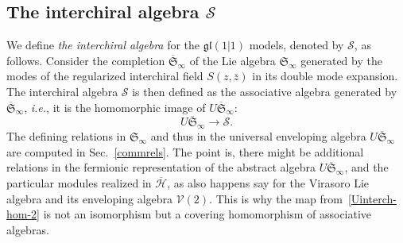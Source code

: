 \documentclass[11pt]{article}
\newcommand{\Hilb}{\mathcal{H}}
\newcommand{\cHilb}{\overline{\Hilb}}
\newcommand{\Vir}{\mathcal{V}}
\newcommand{\interLie}{\mathfrak{S}}
\newcommand{\interchalg}{\mathcal{S}}
\newcommand{\interinfin}{\interLie_{\infty}}
\newcommand{\interinfinco}{\overline{\interLie}_{\infty}}
\newcommand{\gl}{\mathfrak{gl}}
\newcommand{\bz}{\bar{z}}
\newcommand{\enrg}{S}
\theoremstyle{definition}
\begin{document}
\subsection{The interchiral algebra $\interchalg$}\label{sec:interdef}
We define {\it the interchiral algebra} for the $\gl(1|1)$ models, denoted by  $\interchalg$, as follows.
Consider the completion $\interinfinco$ of the Lie algebra $\interinfin$ generated by the modes of the regularized interchiral field  $\enrg(z,\bz)$ in its double mode expansion. The interchiral algebra  $\interchalg$ is then defined as the associative algebra generated by $\interinfinco$, {\it i.e.}, it is  the homomorphic image
of $U \interinfinco$:
\begin{equation}\label{Uinterch-hom-2}
 U\interinfinco\longrightarrow\interchalg.
\end{equation}
The defining relations in $\interinfin$ and thus in  the universal enveloping algebra $U\interinfinco$ are computed in Sec.~\ref{commrels}. The point is, there might be additional relations in the fermionic representation of the abstract algebra $U\interinfinco$, and the particular modules realized in $\cHilb$, as  also happens say for the Virasoro Lie algebra and its enveloping algebra $\Vir(2)$. This is why the map from~\eqref{Uinterch-hom-2} is not an isomorphism but a covering homomorphism of associative algebras.
\end{document}
